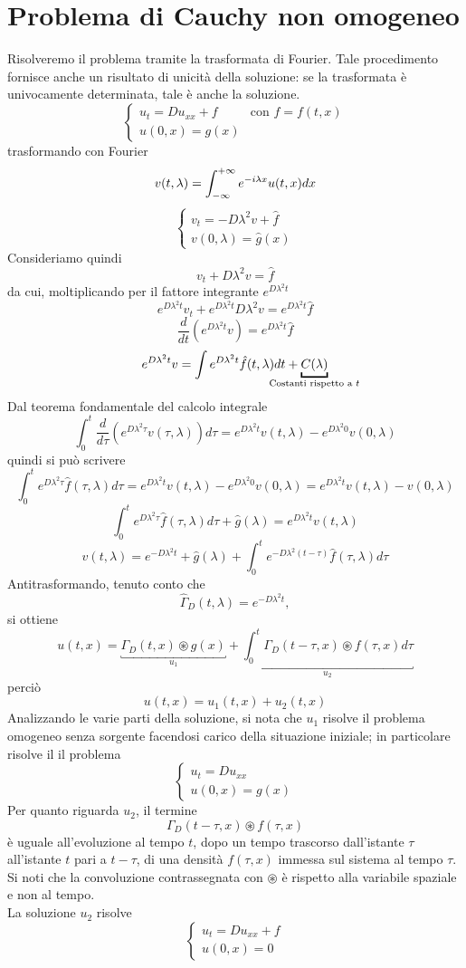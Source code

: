 \section{Problema di Cauchy non omogeneo}
Risolveremo il problema tramite la trasformata di Fourier.
Tale procedimento fornisce anche un risultato di unicit\`a della soluzione:
se la trasformata \`e univocamente determinata, tale \`e anche la soluzione.
\[
	\left\{
	\begin{array}{ll}
		u_t= Du_{xx}+ f & \text{con } f= f(t,x)\\
		u(0,x)= g(x)
	\end{array}
	\right.
\]
trasformando con Fourier
\[
	v(t,\lambda)= \int_{- \infty}^{+ \infty} e^{-i\lambda x} u(t,x) dx
\]
\[
	\left\{
	\begin{array}{l}
		v_t= -D\lambda^2 v+ \hat{f} \\
		v(0,\lambda)= \hat{g}(x)
	\end{array}
	\right.
\]
Consideriamo quindi
\[
	v_t + D \lambda^2 v =\hat{f}
\]
da cui, moltiplicando per il fattore integrante $e^{D\lambda^2 t}$
\[
	e^{D\lambda^2 t} v_t + e^{D\lambda^2 t} D \lambda^2 v
	=e^{D\lambda^2 t} \hat{f}
\]
\[
	\frac{d}{dt}\left(
	e^{D\lambda^2 t} v \right)
	= e^{D\lambda^2 t} \hat{f}
\]
\[
	e^{D\lambda^2 t} v
	= \int e^{D\lambda^2 t} \hat{f}(t, \lambda) dt
	+\underbracket{C(\lambda)}_{\mathclap{\text{Costanti rispetto a } t}}
\]
Dal teorema fondamentale del calcolo integrale
\[
	\int_0^t \frac{d}{d\tau}\left(
	e^{D\lambda^2 \tau} v(\tau, \lambda) \right) d\tau=
	e^{D\lambda^2 t} v(t, \lambda) - e^{D\lambda^2 0} v(0,\lambda)
\]
quindi si pu\`o scrivere
\[
	\int_0^t e^{D\lambda^2 \tau} \hat{f}(\tau, \lambda) d\tau
	= e^{D\lambda^2 t} v(t, \lambda) - e^{D\lambda^2 0} v(0,\lambda)
	= e^{D\lambda^2 t} v(t, \lambda) - v(0,\lambda)
\]
\[
	\int_0^t e^{D\lambda^2 \tau} \hat{f}(\tau, \lambda) d\tau
	+\hat{g}(\lambda)
	= e^{D\lambda^2 t} v(t, \lambda)
\]
\[
	v(t,\lambda)= e^{-D\lambda^2 t} +\hat{g}(\lambda)
	+ \int_0^t e^{-D\lambda^2 (t - \tau)} \hat{f}(\tau, \lambda) d\tau
\]
Antitrasformando, tenuto conto che
\[
	\hat{\Gamma}_D(t,\lambda)= e^{-D\lambda^2 t},
\]
si ottiene
\[
	u(t,x)= \underbracket{\Gamma_D(t,x)\circledast g(x)}_{u_1}+
	\underbracket{\int_0^t \Gamma_D(t-\tau, x)
	\circledast f(\tau, x) d\tau}_{u_2}
\]
perci\`o
\[
	u(t,x)= u_1(t,x)+ u_2(t,x)
\]
Analizzando le varie parti della soluzione, si nota che $u_1$ risolve
il problema omogeneo senza sorgente facendosi carico della situazione
iniziale; in particolare risolve il il problema
\[
	\left\{
	\begin{array}{l}
		u_t=Du_{xx} \\
		u(0,x)= g(x)
	\end{array}
	\right.
\]
Per quanto riguarda $u_2$, il termine
\[
	\Gamma_D(t-\tau, x)
	\circledast f(\tau, x)
\]
\`e uguale all'evoluzione al tempo $t$, dopo un tempo trascorso dall'istante
$\tau$ all'istante $t$ pari a $t-\tau$, di una densit\`a $f(\tau, x)$ immessa
sul sistema al tempo $\tau$. Si noti che la convoluzione contrassegnata con
$\circledast$ \`e rispetto alla variabile spaziale e non al tempo.\\
La soluzione $u_2$ risolve
\[
	\left\{
	\begin{array}{l}
		u_t=Du_{xx} +f \\
		u(0,x)= 0
	\end{array}
	\right.
\]
